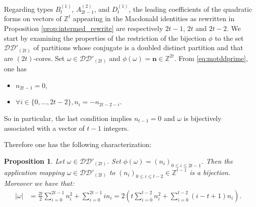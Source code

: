 \documentclass[11pt,letterpaper]{amsart}
\def\bbbz{\mathbb Z}
\def\ccdd{\mathcal {DD}}
\newtheorem{prop}[df]{Proposition}		%
\numberwithin{equation}{section}
\numberwithin{df}{section}
\begin{document}
%
Regarding types $B^{(1)}_{t}$, $A^{(2)}_{2t-1}$, and $D^{(1)}_{t}$, the leading coefficients of the quadratic forms on vectors of $\bbbz^t$ appearing in the Macdonald identities as rewritten in Proposition \ref{prop:intermed_rewrite} are respectively $2t-1$, $2t$ and $2t-2$. We start by examining the properties of the restriction of the bijection $\phi$ to the set $\ccdd'_{(2t)}$ of partitions whose conjugate is a doubled distinct partition and that are $(2t)$-cores. Set $\omega\in \ccdd'_{(2t)}$ and $\phi(\omega)=\mathbf{n}\in\bbbz^{2t}$. From \eqref{eq:motddprime}, one has
\begin{itemize}
\item $n_{2t-1}=0$,
\item $\forall i \in \lbrace 0,\dots,2t-2\rbrace, n_i=-n_{2t-2-i}$.
\end{itemize}

\noindent So in particular, the last condition implies $n_{t-1}=0$ and $\omega$ is bijectively associated with a vector of $t-1$ integers.

Therefore one has the following characterization:

\begin{prop}\label{prop:ddprime2tcore}
Let $\omega\in \ccdd'_{(2t)}$. Set $\phi(\omega)=(n_i)_{0\leq i\leq 2t-1}$. Then the application mapping $\omega\in\ccdd'_{(2t)}$ to $(n_i)_{0\leq i\leq t-2}\in\mathbb{Z}^{t-1}$ is a bijection. Moreover we have that:
\begin{align}
\lvert \omega \rvert &=\frac{2t}{2}\sum_{i=0}^{2t-1}n_i^2+\sum_{i=0}^{2t-1}in_i=2\left(t\sum_{i=0}^{t-2}n_i^2+\sum_{i=0}^{t-2}(i-t+1)n_i\right).\label{eq:gkddprimepair}
\end{align}

\end{prop}
\end{document}
